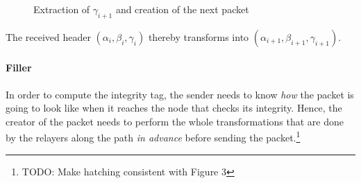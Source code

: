 \begin{figure}[H]
    \caption{Extraction of $\gamma_{i+1}$ and creation of the next packet}
\end{figure}

The received header $(\alpha_i,\beta_i,\gamma_i)$ thereby transforms into $(\alpha_{i+1},\beta_{i+1},\gamma_{i+1})$.

\paragraph{Filler}

In order to compute the integrity tag, the sender needs to know \textit{how} the packet is going to look like when it reaches the node that checks its integrity. Hence, the creator of the packet needs to perform the whole transformations that are done by the relayers along the path \textit{in advance} before sending the packet.\footnote{TODO: Make hatching consistent with Figure 3}

